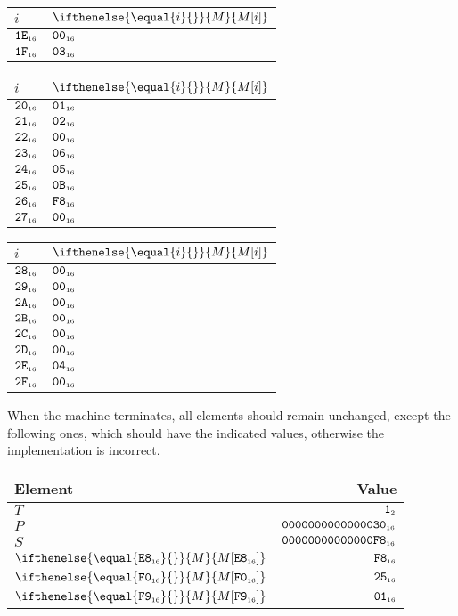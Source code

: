 \documentclass[a4paper,12pt]{article}
\makeatletter
\newcommand{\num}[1]{\texttt{#1}}
\newcommand{\hex}[1]{\num{#1}_{\textup{\tiny 16}}}
\newcommand{\bin}[1]{\num{#1}_{\textup{\tiny 2}}}
\newcommand{\MEM}[1]{\ifthenelse{\equal{#1}{}}{M}{M[#1]}}
\newcommand{\PC}{P}
\newcommand{\SP}{S}
\newcommand{\TERM}{T}
\newcommand{\T}{\bin{1}}
\newenvironment{memtable}{%
  \begin{trivlist}
    \item
    }{%
    \end{trivlist}}
\newenvironment{memcolumn}{%
  \begin{tabular}{@{}ll@{}}
    $i$ & $\MEM{i}$ \\
    \hline}
    {%
  \end{tabular}}
\newcommand{\memspace}{\qquad}
\makeatother
\begin{document}
\begin{memtable}
\begin{memcolumn}
    $\hex{1E}$ & $\hex{00}$ \\
    $\hex{1F}$ & $\hex{03}$ \\
  \end{memcolumn}
  \memspace
  \begin{memcolumn}
    $\hex{20}$ & $\hex{01}$ \\
    $\hex{21}$ & $\hex{02}$ \\
    $\hex{22}$ & $\hex{00}$ \\
    $\hex{23}$ & $\hex{06}$ \\
    $\hex{24}$ & $\hex{05}$ \\
    $\hex{25}$ & $\hex{0B}$ \\
    $\hex{26}$ & $\hex{F8}$ \\
    $\hex{27}$ & $\hex{00}$ \\
  \end{memcolumn}
  \memspace
  \begin{memcolumn}
    $\hex{28}$ & $\hex{00}$ \\
    $\hex{29}$ & $\hex{00}$ \\
    $\hex{2A}$ & $\hex{00}$ \\
    $\hex{2B}$ & $\hex{00}$ \\
    $\hex{2C}$ & $\hex{00}$ \\
    $\hex{2D}$ & $\hex{00}$ \\
    $\hex{2E}$ & $\hex{04}$ \\
    $\hex{2F}$ & $\hex{00}$ \\
  \end{memcolumn}
\end{memtable}
When the machine terminates, all elements should remain unchanged, except the following ones, which should have the indicated values, otherwise the implementation is incorrect.
\begin{trivlist}
  \item
  \begin{tabular}{@{}lr@{}}
    Element          & Value                     \\
    \hline
    $\TERM$          & $\T$                      \\
    $\PC$            & $\hex{0000000000000030}$ \\
    $\SP$            & $\hex{00000000000000F8}$ \\
    $\MEM{\hex{E8}}$ & $\hex{F8}$ \\
    $\MEM{\hex{F0}}$ & $\hex{25}$ \\
    $\MEM{\hex{F9}}$ & $\hex{01}$ \\
    \hline
  \end{tabular}
\end{trivlist}
\end{document}
